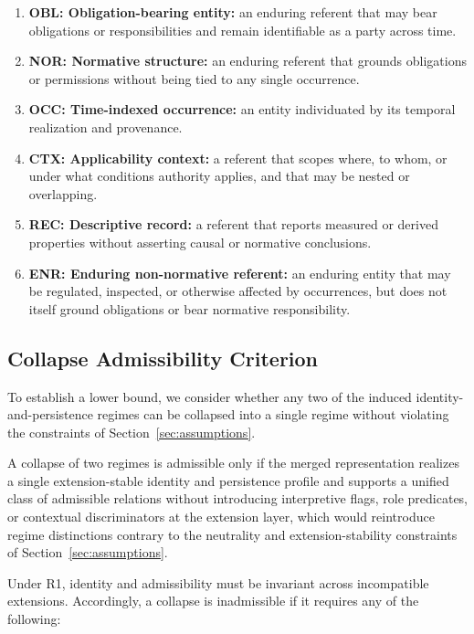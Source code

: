 \begin{enumerate}
\item \textbf{OBL: Obligation-bearing entity:} an enduring referent that may bear
      obligations or responsibilities and remain identifiable as a party across time.
\item \textbf{NOR: Normative structure:} an enduring referent that grounds
      obligations or permissions without being tied to any single occurrence.
\item \textbf{OCC: Time-indexed occurrence:} an entity individuated by its
      temporal realization and provenance.
\item \textbf{CTX: Applicability context:} a referent that scopes where, to whom,
      or under what conditions authority applies, and that may be nested or overlapping.
\item \textbf{REC: Descriptive record:} a referent that reports measured
      or derived properties without asserting causal or normative conclusions.
\item \textbf{ENR: Enduring non-normative referent:} an enduring entity
that may be regulated, inspected, or otherwise affected by occurrences,
but does not itself ground obligations or bear normative responsibility.
\end{enumerate}

\subsection{Collapse Admissibility Criterion}
\label{sec:collapse_strategy}

To establish a lower bound, we consider whether any two of the
induced identity-and-persistence regimes can be collapsed
into a single regime without violating the constraints of
Section~\ref{sec:assumptions}.

A collapse of two regimes is admissible only if the merged
representation realizes a single extension-stable identity
and persistence profile and supports a unified class of admissible relations
without introducing interpretive flags, role predicates,
or contextual discriminators at the extension layer,
which would reintroduce regime distinctions contrary to
the neutrality and extension-stability constraints of
Section~\ref{sec:assumptions}.

Under R1, identity and admissibility must be invariant across
incompatible extensions.
Accordingly, a collapse is inadmissible if it requires
any of the following:

